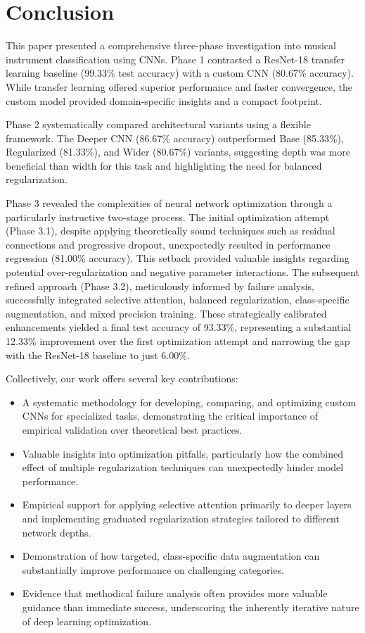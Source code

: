 \section{Conclusion}
This paper presented a comprehensive three-phase investigation into musical instrument classification using CNNs. Phase 1 contrasted a ResNet-18 transfer learning baseline (99.33\% test accuracy) with a custom CNN (80.67\% accuracy). While transfer learning offered superior performance and faster convergence, the custom model provided domain-specific insights and a compact footprint.

Phase 2 systematically compared architectural variants using a flexible framework. The Deeper CNN (86.67\% accuracy) outperformed Base (85.33\%), Regularized (81.33\%), and Wider (80.67\%) variants, suggesting depth was more beneficial than width for this task and highlighting the need for balanced regularization.

Phase 3 revealed the complexities of neural network optimization through a particularly instructive two-stage process. The initial optimization attempt (Phase 3.1), despite applying theoretically sound techniques such as residual connections and progressive dropout, unexpectedly resulted in performance regression (81.00\% accuracy). This setback provided valuable insights regarding potential over-regularization and negative parameter interactions. The subsequent refined approach (Phase 3.2), meticulously informed by failure analysis, successfully integrated selective attention, balanced regularization, class-specific augmentation, and mixed precision training. These strategically calibrated enhancements yielded a final test accuracy of 93.33\%, representing a substantial 12.33\% improvement over the first optimization attempt and narrowing the gap with the ResNet-18 baseline to just 6.00\%.

Collectively, our work offers several key contributions:
\begin{itemize}
    \item A systematic methodology for developing, comparing, and optimizing custom CNNs for specialized tasks, demonstrating the critical importance of empirical validation over theoretical best practices.
    \item Valuable insights into optimization pitfalls, particularly how the combined effect of multiple regularization techniques can unexpectedly hinder model performance.
    \item Empirical support for applying selective attention primarily to deeper layers and implementing graduated regularization strategies tailored to different network depths.
    \item Demonstration of how targeted, class-specific data augmentation can substantially improve performance on challenging categories.
    \item Evidence that methodical failure analysis often provides more valuable guidance than immediate success, underscoring the inherently iterative nature of deep learning optimization.
\end{itemize}

